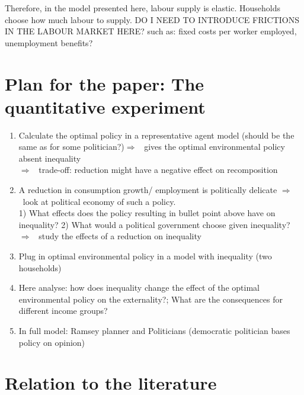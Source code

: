 \documentclass[12pt]{article}
\newcommand{\ar}{$\Rightarrow$ \ }
\begin{document}
Therefore, in the model presented here, labour supply is elastic. Households choose how much labour to supply. DO I NEED TO INTRODUCE FRICTIONS IN THE LABOUR MARKET HERE? such as: fixed costs per worker employed, unemployment benefits? 



\section{Plan for the paper: The quantitative experiment}
\begin{enumerate}
\item Calculate the optimal policy in a representative agent model (should be the same as for some politician?)\ar gives the optimal environmental policy absent inequality\\
\ar trade-off: reduction might have a negative effect on recomposition


\item A reduction in consumption growth/ employment is politically delicate \ar look at political economy of such a policy. \\
1) What effects does the policy resulting in bullet point above have on inequality?
2) What would a political government choose given inequality? 
\ar study the effects of a reduction on inequality

\item Plug in optimal environmental policy in a model with inequality (two households) 
\item Here analyse: how does inequality change the effect of the optimal environmental policy on the externality?; What are the consequences for different income groups?
\item In full model: Ramsey planner and Politicians (democratic politician bases policy on opinion) 
\end{enumerate}

\section{Relation to the literature}
\end{document}
